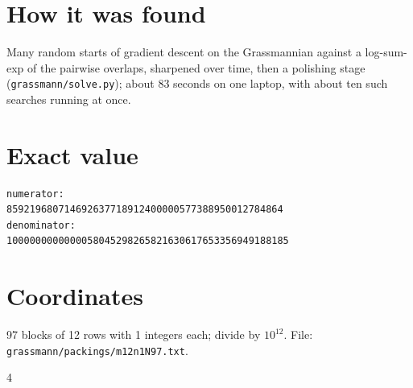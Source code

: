 \documentclass[11pt,a4paper]{article}
\begin{document}
\section{How it was found}
Many random starts of gradient descent on the Grassmannian against a log-sum-exp of the pairwise overlaps, sharpened over time, then a polishing stage (\texttt{grassmann/solve.py}); about 83 seconds on one laptop, with about ten such searches running at once.


\appendix
\section{Exact value}
{\small
\begin{verbatim}
numerator:
859219680714692637718912400000577388950012784864
denominator:
1000000000000058045298265821630617653356949188185
\end{verbatim}}

\section{Coordinates}
97 blocks of 12 rows with 1 integers each; divide by $10^{12}$. File: \texttt{grassmann/packings/m12n1N97.txt}.
{\tiny
\begin{multicols}{4}
\end{multicols}}
\end{document}
